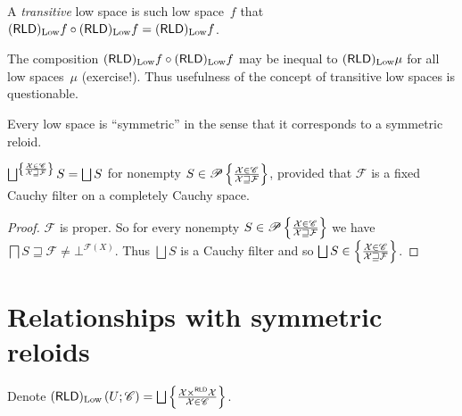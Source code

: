 \begin{defn}
A \emph{transitive} low space is such low space~$f$ that $(\mathsf{RLD})_{\operatorname{Low}}f\circ(\mathsf{RLD})_{\operatorname{Low}}f=(\mathsf{RLD})_{\operatorname{Low}}f$.
\end{defn}

\begin{rem}
The composition $(\mathsf{RLD})_{\operatorname{Low}}f\circ(\mathsf{RLD})_{\operatorname{Low}}f$ may be inequal to $(\mathsf{RLD})_{\operatorname{Low}}\mu$ for all low spaces~$\mu$ (exercise!).
Thus usefulness of the concept of transitive low spaces is questionable.
\end{rem}

\begin{rem}
Every low space is ``symmetric'' in the sense that it corresponds to a symmetric reloid.
\end{rem}

\begin{prop}
  $\bigsqcup^{
    \setcond{\mathcal{X} \in \mathscr{C} }{\mathcal{X} \sqsupseteq \mathcal{F}}
  } S = \bigsqcup S$ for nonempty
  $S \in \mathscr{P} \left\{ \frac{\mathcal{X} \in \mathscr{C} }{\mathcal{X} \sqsupseteq \mathcal{F}}\right\}$,
  provided that $\mathcal{F}$ is a fixed Cauchy filter on a completely Cauchy space.
\end{prop}

\begin{proof}
  $\mathcal{F}$ is proper. So for every nonempty $S \in \mathscr{P}
  \left\{ \frac{\mathcal{X} \in \mathscr{C} }{\mathcal{X} \sqsupseteq \mathcal{F}}\right\}$
  we have $\bigsqcap S \sqsupseteq \mathcal{F} \neq \bot^{\mathscr{F} (X)}$. Thus $\bigsqcup S$ is a Cauchy
  filter and so $\bigsqcup S \in \setcond{\mathcal{X} \in \mathscr{C} }{\mathcal{X} \sqsupseteq \mathcal{F}}$.
\end{proof}

\section{Relationships with symmetric reloids}

\begin{defn}
  Denote $(\mathsf{RLD})_{\Low} \left( U ; \mathscr{C} \right) =
  \bigsqcup \setcond{ \mathcal{X} \times^{\mathsf{RLD}} \mathcal{X}}
  {\mathcal{X} \in \mathscr{C} }$.
\end{defn}

